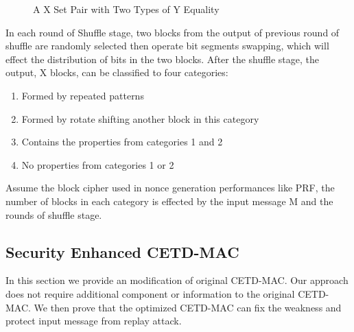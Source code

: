 \documentclass{article}
\begin{document}
\begin{figure}
\centering
{}
\caption{A X Set Pair with Two Types of Y Equality}
 \label{fig:y_both} %
\end{figure}
In each round of Shuffle stage, two blocks from the output of previous round of shuffle are randomly selected then operate bit segments swapping, which will effect the distribution of bits in the two blocks. After the shuffle stage, the output, X blocks, can be classified to four categories:
\begin{enumerate}
	\item Formed by repeated patterns
	\item Formed by rotate shifting another block in this category
	\item Contains the properties from categories 1 and 2
	\item No properties from categories 1 or 2
\end{enumerate}
Assume the block cipher used in nonce generation performances like PRF, the number of blocks in each category is effected by the input message M and the rounds of shuffle stage.  

\subsection{Security Enhanced CETD-MAC}
In this section we provide an modification of original CETD-MAC. Our approach does not require additional component or information to the original CETD-MAC. We then prove that the optimized CETD-MAC can fix the weakness and protect input message from replay attack.
\end{document}
